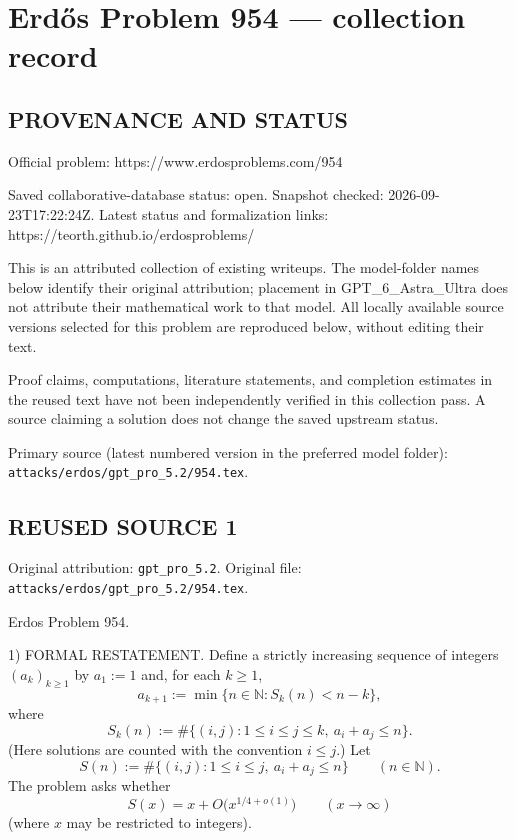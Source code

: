 \section*{Erd\H{o}s Problem 954 --- collection record}

\subsection*{PROVENANCE AND STATUS}
Official problem: https://www.erdosproblems.com/954

Saved collaborative-database status: open.
Snapshot checked: 2026-09-23T17:22:24Z.
Latest status and formalization links: https://teorth.github.io/erdosproblems/

This is an attributed collection of existing writeups. The model-folder names below identify their original attribution; placement in GPT\_6\_Astra\_Ultra does not attribute their mathematical work to that model. All locally available source versions selected for this problem are reproduced below, without editing their text.

Proof claims, computations, literature statements, and completion estimates in the reused text have not been independently verified in this collection pass. A source claiming a solution does not change the saved upstream status.

Primary source (latest numbered version in the preferred model folder): \texttt{attacks/erdos/gpt\_pro\_5.2/954.tex}.

\subsection*{REUSED SOURCE 1}
Original attribution: \texttt{gpt\_pro\_5.2}.
Original file: \texttt{attacks/erdos/gpt\_pro\_5.2/954.tex}.



Erdos Problem 954.

1) FORMAL RESTATEMENT.
Define a strictly increasing sequence of integers $(a_k)_{k\ge 1}$ by
$a_1:=1$ and, for each $k\ge 1$,
\[
 a_{k+1}:=\min\{n\in\mathbb{N}: S_k(n) < n-k\},
\]
where
\[
S_k(n):=\#\{(i,j):1\le i\le j\le k,\ a_i+a_j\le n\}.
\]
(Here solutions are counted with the convention $i\le j$.)
Let
\[
S(n):=\#\{(i,j):1\le i\le j,\ a_i+a_j\le n\}\qquad(n\in\mathbb{N}).
\]
The problem asks whether
\[
S(x)=x+O\bigl(x^{1/4+o(1)}\bigr)\qquad(x\to\infty)
\]
(where $x$ may be restricted to integers).

